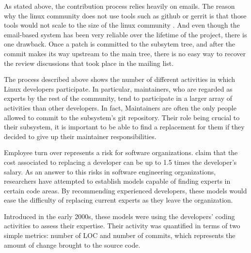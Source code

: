 As stated above, the contribution process relies heavily on emails. The reason why the linux community does not use tools such as github or gerrit is that those tools would not scale to the size of the linux community \citep{armstrong}. And even though the email-based system has been very reliable over the lifetime of the project, there is one drawback. Once a patch is committed to the subsytem tree, and after the commit makes its way upstream to the main tree, there is no easy way to recover the review discussions that took place in the mailing list. 

The process described above shows the number of different activities in which Linux developers participate. In particular, maintainers, who are regarded as experts by the rest of the community, tend to participate in a larger array of activities than other developers. In fact, Maintainers are often the only people allowed to commit to the subsystem's git repository. Their role being crucial to their subsystem, it is important to be able to find a replacement for them if they decided to give up their maintainer responsibilities.










Employee turn over represents a risk for software organizations. \citep{turnover} claim that the cost associated to replacing a developer can be up to 1.5 times the developer's salary. As an answer to this risks in software engineering organizations, researchers have attempted to establish models capable of finding experts in certain code areas. By recommending experienced developers, these models would ease the difficulty of replacing current experts as they leave the organization. 


Introduced in the early 2000s\citep{mockus02}\citep{McDonald}, these models were using the developers' coding activities to assess their expertise. Their activity was quantified in terms of two simple metrics: number of \ac{LOC} and number of commits, which represents the amount of change brought to the source code. 


